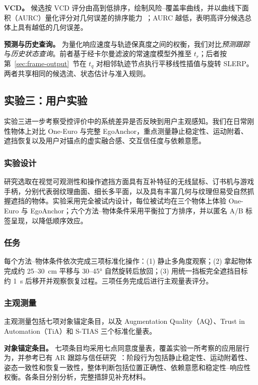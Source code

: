 \documentclass[review]{vgtc}
\begin{document}
\textbf{VCD。}
候选按 VCD 评分由高到低排序，绘制风险--覆盖率曲线，并以曲线下面积（AURC）量化评分对几何误差的排序能力~\cite{riskcontrolled2020,ding2020uncertainty}；AURC 越低，表明高评分候选总体上具有越低的几何误差。

\textbf{预测与历史查询。}
为量化响应速度与轨迹保真度之间的权衡，我们对比\emph{预测跟踪}与\emph{历史状态查询}。前者基于经卡尔曼滤波的常速度模型外推至 $t_r$；后者按第~\ref{sec:frame-output}~节在 $t_q$ 对相邻轨迹节点执行平移线性插值与旋转 SLERP。两者共享相同的候选流、状态估计与准入规则。

\subsection{实验三：用户实验}\label{sec:exp3-design}

实验三进一步考察受控评价中的系统差异是否反映到用户主观感知。我们在日常刚性物体上对比 One-Euro 与完整 EgoAnchor，重点测量静止稳定性、运动附着、遮挡恢复以及用户对锚点的虚实融合感、交互信任度与依赖意愿。

\subsubsection{实验设计}

研究选取在视觉可观测性和操作遮挡方面具有互补特征的无线鼠标、订书机与游戏手柄，分别代表弱纹理曲面、细长多平面，以及具有丰富几何与纹理但易受自然抓握遮挡的物体。实验采用完全被试内设计，每位被试均在三个物体上体验 One-Euro 与 EgoAnchor；六个方法--物体条件采用平衡拉丁方排序，并以匿名 A/B 标签呈现，以降低顺序效应。

\subsubsection{任务}

每个方法--物体条件依次完成三项标准化操作：(1) 静止多角度观察；(2) 拿起物体完成约 25--30~cm 平移与 30--45° 自然旋转后放回；(3) 用统一挡板完全遮挡目标约 1~s 后移开并观察恢复过程。三项任务完成后进行主观量表评分。

\subsubsection{主观测量}

主观测量包括七项对象锚定条目，以及 Augmentation Quality（AQ）、Trust in Automation（TiA）和 S-TIAS 三个标准化量表。

\textbf{对象锚定条目。}
七项条目均采用七点同意度量表，覆盖实验一所考察的应用层行为，并参考已有 AR 跟踪与信任研究~\cite{trustar2024}：阶段行为包括静止稳定性、运动附着性、姿态一致性和恢复一致性，整体判断包括位置正确性、依赖意愿和稳定性--响应性权衡。各条目分别分析，完整措辞见补充材料。
\end{document}

